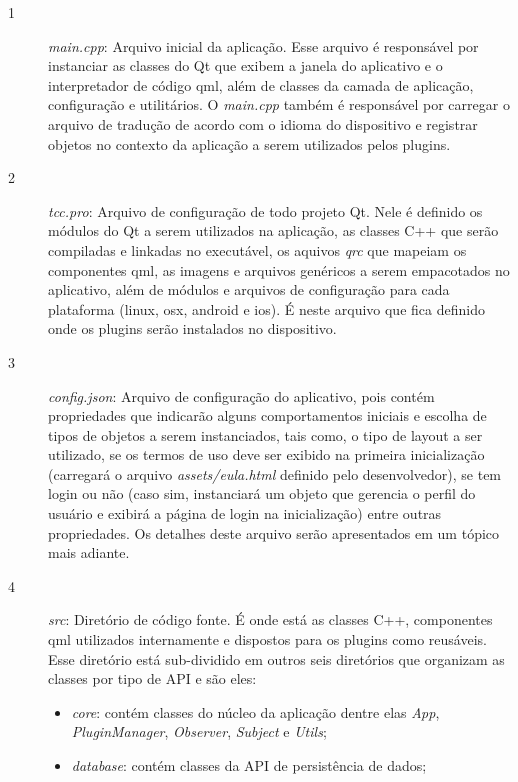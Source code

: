 \begin{description}
	\item[1] \textit{main.cpp}: Arquivo inicial da aplicação. Esse arquivo é responsável por instanciar as classes do Qt que exibem a janela do aplicativo e o interpretador de código qml, além de classes da camada de aplicação, configuração e utilitários. O \textit{main.cpp} também é responsável por carregar o arquivo de tradução de acordo com o idioma do dispositivo e registrar objetos no contexto da aplicação a serem utilizados pelos plugins.

	\item[2] \textit{tcc.pro}: Arquivo de configuração de todo projeto Qt. Nele é definido os módulos do Qt a serem utilizados na aplicação, as classes C++ que serão compiladas e linkadas no executável, os aquivos \textit{qrc} que mapeiam os componentes qml, as imagens e arquivos genéricos a serem empacotados no aplicativo, além de módulos e arquivos de configuração para cada plataforma (linux, osx, android e ios). É neste arquivo que fica definido onde os plugins serão instalados no dispositivo.

	\item[3] \textit{config.json}: Arquivo de configuração do aplicativo, pois contém propriedades que indicarão alguns comportamentos iniciais e escolha de tipos de objetos a serem instanciados, tais como, o tipo de layout a ser utilizado, se os termos de uso deve ser exibido na primeira inicialização (carregará o arquivo \textit{assets/eula.html} definido pelo desenvolvedor), se tem login ou não (caso sim, instanciará um objeto que gerencia o perfil do usuário e exibirá a página de login na inicialização) entre outras propriedades. Os detalhes deste arquivo serão apresentados em um tópico mais adiante.

	\item[4] \textit{src}: Diretório de código fonte. É onde está as classes C++, componentes qml utilizados internamente e dispostos para os plugins como reusáveis. Esse diretório está sub-dividido em outros seis diretórios que organizam as classes por tipo de API e são eles:

	\begin{itemize}
		\item \textit{core}: contém classes do núcleo da aplicação dentre elas \textit{App}, \textit{PluginManager}, \textit{Observer}, \textit{Subject} e \textit{Utils}; 

		\item \textit{database}: contém classes da API de persistência de dados;


\end{itemize}
\end{description}
